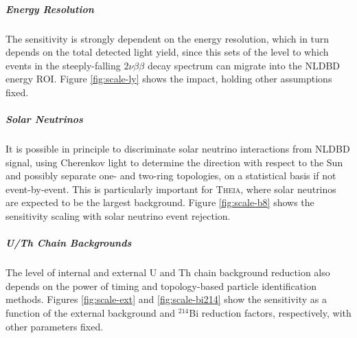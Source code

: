 \noindent

\subparagraph{Energy Resolution}
The sensitivity is strongly dependent on the energy resolution, which in turn
depends on the total detected light yield, since this sets of the level to
which events in the steeply-falling $2\nu\beta\beta$ decay spectrum can
migrate into the NLDBD energy ROI. Figure \ref{fig:scale-ly} shows the
impact, holding other assumptions fixed.

\subparagraph{Solar Neutrinos}
It is possible in principle to discriminate solar neutrino interactions from
NLDBD signal, using Cherenkov light to determine the direction with respect
to the Sun and possibly separate one- and two-ring topologies, on a
statistical basis if not event-by-event. This is particularly important for
\textsc{Theia}, where solar neutrinos are expected to be the largest
background. Figure \ref{fig:scale-b8} shows the sensitivity scaling with solar
neutrino event rejection.

\subparagraph{U/Th Chain Backgrounds}
The level of internal and external U and Th chain background reduction also
depends on the power of timing and topology-based particle identification
methods. Figures \ref{fig:scale-ext} and \ref{fig:scale-bi214} show the
sensitivity as a function of the external background and $^{214}$Bi reduction
factors, respectively, with other parameters fixed.

